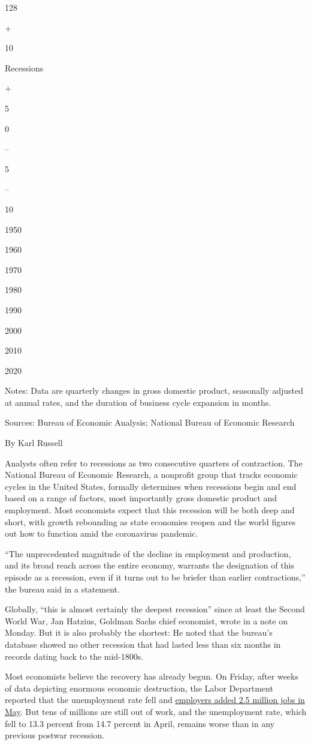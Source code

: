 128

+

10

Recessions

+

5

0

--

5

--

10

1950

1960

1970

1980

1990

2000

2010

2020

Notes: Data are quarterly changes in gross domestic product, seasonally
adjusted at annual rates, and the duration of business cycle expansion
in months.

Sources: Bureau of Economic Analysis; National Bureau of Economic
Research

By Karl Russell

Analysts often refer to recessions as two consecutive quarters of
contraction. The National Bureau of Economic Research, a nonprofit group
that tracks economic cycles in the United States, formally determines
when recessions begin and end based on a range of factors, most
importantly gross domestic product and employment. Most economists
expect that this recession will be both deep and short, with growth
rebounding as state economies reopen and the world figures out how to
function amid the coronavirus pandemic.

``The unprecedented magnitude of the decline in employment and
production, and its broad reach across the entire economy, warrants the
designation of this episode as a recession, even if it turns out to be
briefer than earlier contractions,'' the bureau said in a statement.

Globally, ``this is almost certainly the deepest recession'' since at
least the Second World War, Jan Hatzius, Goldman Sachs chief economist,
wrote in a note on Monday. But it is also probably the shortest: He
noted that the bureau's database showed no other recession that had
lasted less than six months in records dating back to the mid-1800s.

Most economists believe the recovery has already begun. On Friday, after
weeks of data depicting enormous economic destruction, the Labor
Department reported that the unemployment rate fell and
\href{https://www.nytimes3xbfgragh.onion/2020/06/05/business/economy/jobs-report.html}{employers
added 2.5 million jobs in May}. But tens of millions are still out of
work, and the unemployment rate, which fell to 13.3 percent from 14.7
percent in April, remains worse than in any previous postwar recession.

